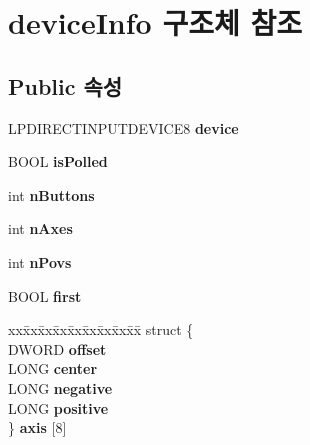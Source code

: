\hypertarget{structdevice_info}{}\section{device\+Info 구조체 참조}
\label{structdevice_info}
\subsection*{Public 속성}
\begin{DoxyCompactItemize}
\item 
\mbox{\label{structdevice_info_a4e2b017b67b850eb267097f95776273f}} 
L\+P\+D\+I\+R\+E\+C\+T\+I\+N\+P\+U\+T\+D\+E\+V\+I\+C\+E8 {\bfseries device}
\item 
\mbox{\label{structdevice_info_a405fccb036e90884fb822c59433c2490}} 
B\+O\+OL {\bfseries is\+Polled}
\item 
\mbox{\label{structdevice_info_ad88fd10c7065c35ea68687b9871ebed0}} 
int {\bfseries n\+Buttons}
\item 
\mbox{\label{structdevice_info_a5ceef6ccdfa5c12661b77e036ba91682}} 
int {\bfseries n\+Axes}
\item 
\mbox{\label{structdevice_info_a5554d019728b7dace75256a64411417c}} 
int {\bfseries n\+Povs}
\item 
\mbox{\label{structdevice_info_a0bc40134953f30c68ccf0d2d69e67f17}} 
B\+O\+OL {\bfseries first}
\item 
\mbox{\label{structdevice_info_aa3139c27b267c0ec8b6f4d96629ee0e2}} 
\begin{tabbing}
xx\=xx\=xx\=xx\=xx\=xx\=xx\=xx\=xx\=\kill
struct \{\\
\>DWORD {\bfseries offset}\\
\>LONG {\bfseries center}\\
\>LONG {\bfseries negative}\\
\>LONG {\bfseries positive}\\
\} {\bfseries axis} \mbox{[}8\mbox{]}\\


\end{tabbing}
\end{DoxyCompactItemize}
